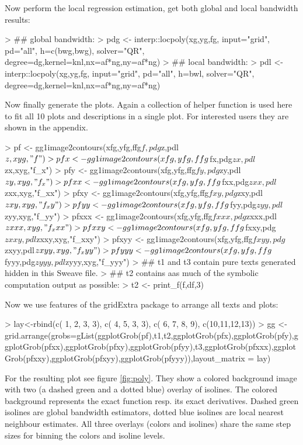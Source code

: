 \documentclass[nojss]{jss}
\begin{document}
Now perform the local regression estimation, get both global and local
bandwidth results:
\begin{Schunk}
\begin{Sinput}
> ## global bandwidth:
> pdg <- interp::locpoly(xg,yg,fg, input="grid", pd="all", h=c(bwg,bwg), solver="QR", degree=dg,kernel=knl,nx=af*ng,ny=af*ng)
> ## local bandwidth:
> pdl <- interp::locpoly(xg,yg,fg, input="grid", pd="all", h=bwl, solver="QR", degree=dg,kernel=knl,nx=af*ng,ny=af*ng)
\end{Sinput}
\end{Schunk}
Now finally generate the plots. Again a collection of helper function
is used here to fit all 10 plots and descriptions in a single plot.
For interested users they are shown in the appendix.
\begin{Schunk}
\begin{Sinput}
> pf <- gg1image2contours(xfg,yfg,ffg$f,pdg$z,pdl$z,xyg,"f")
> pfx <- gg1image2contours(xfg,yfg,ffg$fx,pdg$zx,pdl$zx,xyg,"f_x")
> pfy <- gg1image2contours(xfg,yfg,ffg$fy,pdg$zy,pdl$zy,xyg,"f_x")
> pfxx <- gg1image2contours(xfg,yfg,ffg$fxx,pdg$zxx,pdl$zxx,xyg,"f_xx")
> pfxy <- gg1image2contours(xfg,yfg,ffg$fxy,pdg$zxy,pdl$zxy,xyg,"f_xy")
> pfyy <- gg1image2contours(xfg,yfg,ffg$fyy,pdg$zyy,pdl$zyy,xyg,"f_yy")
> pfxxx <- gg1image2contours(xfg,yfg,ffg$fxxx,pdg$zxxx,pdl$zxxx,xyg,"f_xxx")
> pfxxy <- gg1image2contours(xfg,yfg,ffg$fxxy,pdg$zxxy,pdl$zxxy,xyg,"f_xxy")
> pfxyy <- gg1image2contours(xfg,yfg,ffg$fxyy,pdg$zxyy,pdl$zxyy,xyg,"f_xyy")
> pfyyy <- gg1image2contours(xfg,yfg,ffg$fyyy,pdg$zyyy,pdl$zyyy,xyg,"f_yyy")
> ## t1 and t3 contain pure texts generated hidden in this Sweave file.
> ## t2 contains aas much of the symbolic computation output as possible:
> t2 <- print_f(f,df,3)
\end{Sinput}
\end{Schunk}
Now we use features of the gridExtra package to arrange all texts and plots:
\begin{Schunk}
\begin{Sinput}
> lay<-rbind(c( 1, 2, 3, 3),
            c( 4, 5, 3, 3),
            c( 6, 7, 8, 9),
            c(10,11,12,13))
> gg <- grid.arrange(grobs=gList(ggplotGrob(pf),t1,t2,ggplotGrob(pfx),ggplotGrob(pfy),ggplotGrob(pfxx),ggplotGrob(pfxy),ggplotGrob(pfyy),t3,ggplotGrob(pfxxx),ggplotGrob(pfxxy),ggplotGrob(pfxyy),ggplotGrob(pfyyy)),layout_matrix = lay)
\end{Sinput}
\end{Schunk}
For the resulting plot see figure \ref{fig:poly}. They show a colored background image
with two (a dashed green and a dotted blue) overlay of isolines.
The colored background represents the exact function resp. its exact derivatives.
Dashed green isolines are global bandwidth estimators, dotted blue isolines are local 
nearest neighbour estimates. All three overlays (colors and isolines) share the same 
step sizes for binning the colors and isoline levels.
\end{document}

